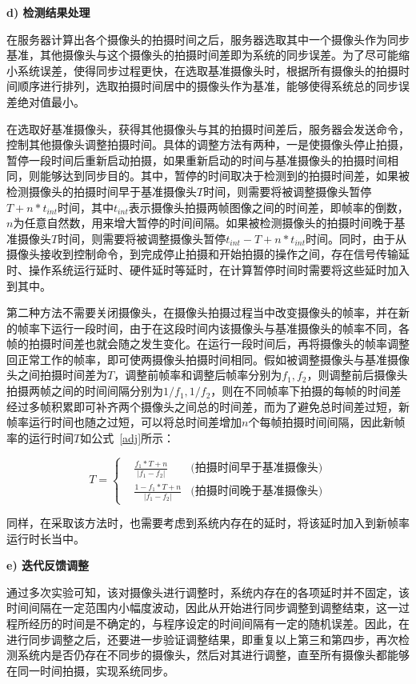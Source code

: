 \textbf{d) 检测结果处理}

在服务器计算出各个摄像头的拍摄时间之后，服务器选取其中一个摄像头作为同步基准，其他摄像头与这个摄像头的拍摄时间差即为系统的同步误差。为了尽可能缩小系统误差，使得同步过程更快，在选取基准摄像头时，根据所有摄像头的拍摄时间顺序进行排列，选取拍摄时间居中的摄像头作为基准，能够使得系统总的同步误差绝对值最小。

在选取好基准摄像头，获得其他摄像头与其的拍摄时间差后，服务器会发送命令，控制其他摄像头调整拍摄时间。具体的调整方法有两种，一是使摄像头停止拍摄，暂停一段时间后重新启动拍摄，如果重新启动的时间与基准摄像头的拍摄时间相同，则能够达到同步目的。其中，暂停的时间取决于检测到的拍摄时间差，如果被检测摄像头的拍摄时间早于基准摄像头$T$时间，则需要将被调整摄像头暂停$T + n * t_{int}$时间，其中$t_{int}$表示摄像头拍摄两帧图像之间的时间差，即帧率的倒数，$n$为任意自然数，用来增大暂停的时间间隔。如果被检测摄像头的拍摄时间晚于基准摄像头$T$时间，则需要将被调整摄像头暂停$t_{int} - T + n * t_{int}$时间。同时，由于从摄像头接收到控制命令，到完成停止拍摄和开始拍摄的操作之间，存在信号传输延时、操作系统运行延时、硬件延时等延时，在计算暂停时间时需要将这些延时加入到其中。

第二种方法不需要关闭摄像头，在摄像头拍摄过程当中改变摄像头的帧率，并在新的帧率下运行一段时间，由于在这段时间内该摄像头与基准摄像头的帧率不同，各帧的拍摄时间差也就会随之发生变化。在运行一段时间后，再将摄像头的帧率调整回正常工作的帧率，即可使两摄像头拍摄时间相同。假如被调整摄像头与基准摄像头之间拍摄时间差为$T$，调整前帧率和调整后帧率分别为$f_1, f_2$，则调整前后摄像头拍摄两帧之间的时间间隔分别为$1/f_1, 1/f_2$，则在不同帧率下拍摄的每帧的时间差经过多帧积累即可补齐两个摄像头之间总的时间差，而为了避免总时间差过短，新帧率运行时间也随之过短，可以将总时间差增加$n$个每帧拍摄时间间隔，因此新帧率的运行时间$T$如公式~\ref{adj}所示：

\begin{equation}
T = \left\{
\begin{aligned}
&\frac {f_1*T + n}{|f_1- f_2|} & \text{(拍摄时间早于基准摄像头)}\\
&\frac {1- f_1*T + n}{|f_1- f_2|}  &\text{(拍摄时间晚于基准摄像头)}
\end{aligned}
\right.
  \label{adj}
\end{equation}

同样，在采取该方法时，也需要考虑到系统内存在的延时，将该延时加入到新帧率运行时长当中。

\textbf{e) 迭代反馈调整}

通过多次实验可知，该对摄像头进行调整时，系统内存在的各项延时并不固定，该时间间隔在一定范围内小幅度波动，因此从开始进行同步调整到调整结束，这一过程所经历的时间是不确定的，与程序设定的时间间隔有一定的随机误差。因此，在进行同步调整之后，还要进一步验证调整结果，即重复以上第三和第四步，再次检测系统内是否仍存在不同步的摄像头，然后对其进行调整，直至所有摄像头都能够在同一时间拍摄，实现系统同步。


